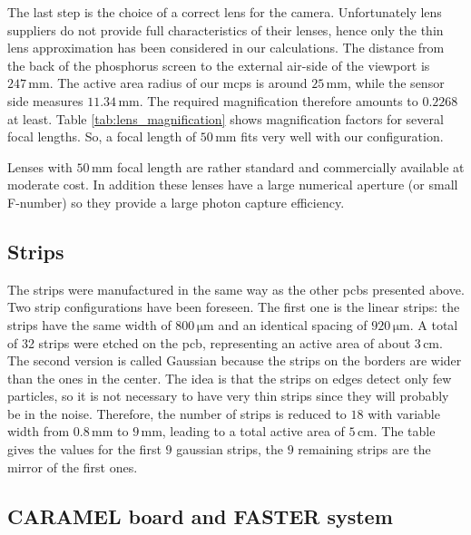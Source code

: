 \begin{refsection}
  The last step is the choice of a correct lens for the camera.
  Unfortunately lens suppliers do not provide full characteristics of their lenses, hence only the thin lens approximation has been considered in our calculations. The distance from the back of the phosphorus screen to the external air-side of the viewport is $247\,\mathrm{mm}$. The active area radius of our \acrshort{mcp}s is around $25\,\mathrm{mm}$, while the sensor side measures $11.34\,\mathrm{mm}$. The required magnification therefore amounts to $0.2268$ at least.
  Table \ref{tab:lens_magnification} shows magnification factors for several focal lengths. So, a focal length of $50\,\mathrm{mm}$ fits very well with our configuration.
  

  Lenses with $50\,\mathrm{mm}$ focal length are rather standard and commercially available at moderate cost. In addition these lenses have a large numerical aperture (or small F-number) so they provide a large photon capture efficiency.

  \subsection{Strips}

  The strips were manufactured in the same way as the other \acrshort{pcb}s presented above. Two strip configurations have been foreseen. The first one is the linear strips: the strips have the same width of $800\,\mathrm{\mu m}$ and an identical spacing of $920\,\mathrm{\mu m}$. A total of 32 strips were etched on the \acrshort{pcb}, representing an active area of about $3\,\mathrm{cm}$. The second version is called Gaussian because the strips on the borders are wider than the ones in the center. The idea is that the strips on edges detect only few particles, so it is not necessary to have very thin strips since they will probably be in the noise. Therefore, the number of strips is reduced to $18$ with variable width from $0.8\,\mathrm{mm}$ to $9\,\mathrm{mm}$, leading to a total active area of $5\,\mathrm{cm}$. The table gives the values for the first $9$ gaussian strips, the $9$ remaining strips are the mirror of the first ones.

  

  \subsection{CARAMEL board and FASTER system}


\end{refsection}
